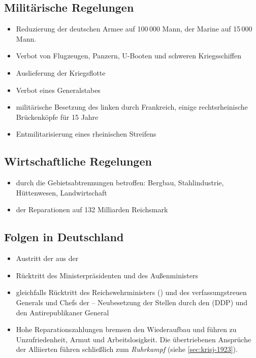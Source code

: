 \subsection*{Militärische Regelungen}

\begin{itemize}
\item Reduzierung der deutschen Armee auf 100\,000 Mann, der Marine
auf 15\,000 Mann.
\item Verbot von Flugzeugen, Panzern, U-Booten und schweren
Kriegsschiffen
\item Auslieferung der Kriegsflotte
\item Verbot eines Generalstabes
\item militärische Besetzung des linken 
durch Frankreich, einige rechtsrheinische
Brückenköpfe für 15 Jahre
\item Entmilitarisierung eines rheinischen Streifens
\end{itemize}


\subsection*{Wirtschaftliche Regelungen}

\begin{itemize}
\item durch die Gebietsabtrennungen betroffen: Bergbau,
Stahlindustrie, Hüttenwesen, Landwirtschaft
\item {} der Reparationen auf 132 Milliarden
Reichsmark
\end{itemize}


\subsection*{Folgen in Deutschland}

\begin{itemize}
\item Austritt der  aus der 

\item Rücktritt des Ministerpräsidenten  und des Außenministers

\item gleichfalls Rücktritt des Reichswehrministers  () und des verfassungstreuen Generals
und Chefs der   -- Neubesetzung der Stellen durch den
  (DDP) und den
Antirepublikaner General 

\item Hohe Reparationszahlungen bremsen den Wiederaufbau und führen zu
Unzufriedenheit, Armut und Arbeitslosigkeit. Die übertriebenen
Ansprüche der Alliierten führen schließlich zum
\emph{Ruhrkampf} (siehe \ref{sec:krisj-1923}).
\end{itemize}



\endinput
